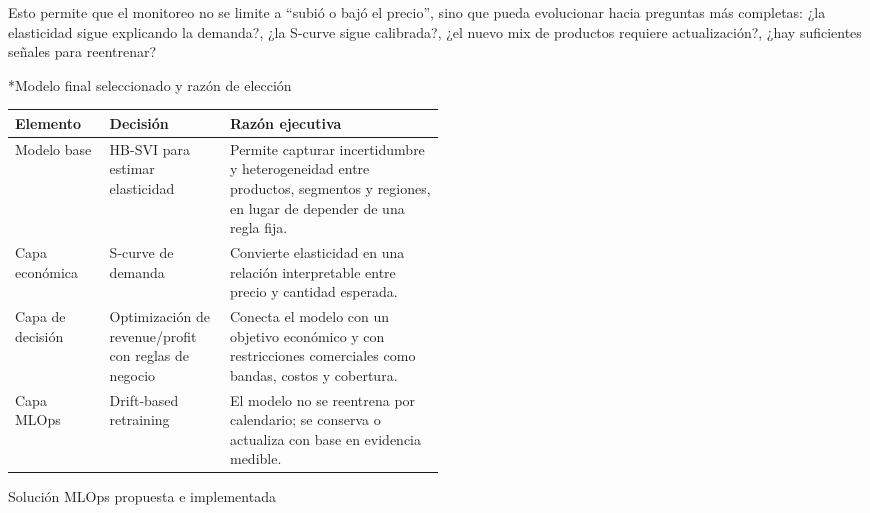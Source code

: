 \documentclass[11pt,letterpaper]{article}
\makeatletter
\renewcommand\section{\@startsection{section}{1}{\z@}
  {-3.5ex \@plus -1ex \@minus -.2ex}
  {2.3ex \@plus .2ex}
  {\Large\bfseries\sffamily\color{azulTec}}}
\renewcommand\subsection{\@startsection{subsection}{2}{\z@}
  {-3.25ex \@plus -1ex \@minus -.2ex}
  {1.5ex \@plus .2ex}
  {\large\bfseries\sffamily\color{azulTec}}}
\makeatother
\begin{document}
Esto permite que el monitoreo no se limite a ``subió o bajó el precio'', sino que pueda evolucionar hacia preguntas más completas: ¿la elasticidad sigue explicando la demanda?, ¿la S-curve sigue calibrada?, ¿el nuevo mix de productos requiere actualización?, ¿hay suficientes señales para reentrenar?

\subsection*{Modelo final seleccionado y razón de elección}

\begin{tabularx}{\linewidth}{L{0.22\linewidth}L{0.28\linewidth}Y}
\toprule
\textbf{Elemento} & \textbf{Decisión} & \textbf{Razón ejecutiva} \\
\midrule
Modelo base & HB-SVI para estimar elasticidad & Permite capturar incertidumbre y heterogeneidad entre productos, segmentos y regiones, en lugar de depender de una regla fija. \\
Capa económica & S-curve de demanda & Convierte elasticidad en una relación interpretable entre precio y cantidad esperada. \\
Capa de decisión & Optimización de revenue/profit con reglas de negocio & Conecta el modelo con un objetivo económico y con restricciones comerciales como bandas, costos y cobertura. \\
Capa MLOps & Drift-based retraining & El modelo no se reentrena por calendario; se conserva o actualiza con base en evidencia medible. \\
\bottomrule
\end{tabularx}

\section{Solución MLOps propuesta e implementada}
\end{document}

